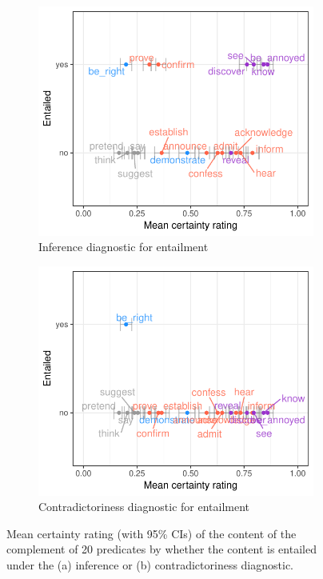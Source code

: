 \documentclass[12pt,fleqn]{article}
\newcommand{\6}{\mbox{$[\hspace*{-.6mm}[$}}
\newcommand{\9}{\mbox{$]\hspace*{-.6mm}]$}}
\begin{document}
\begin{figure}[h]

\begin{subfigure}{.5\textwidth}
\centering
\includegraphics[width=.3\paperwidth]{../results/5-projectivity-no-fact/graphs/projection-by-inferenceEntailment}
\caption{Inference diagnostic for entailment}
\end{subfigure}%
\begin{subfigure}{.5\textwidth}
\centering
\includegraphics[width=.3\paperwidth]{../results/5-projectivity-no-fact/graphs/projection-by-contradictorinessEntailment}
\caption{Contradictoriness diagnostic for entailment}
\end{subfigure}

\caption{Mean certainty rating (with 95\% CIs) of the content of the complement of 20 predicates by whether the content is entailed under the (a) inference or (b) contradictoriness diagnostic.}\label{f-summary-categorical}

\end{figure}

\newpage



\end{document}
